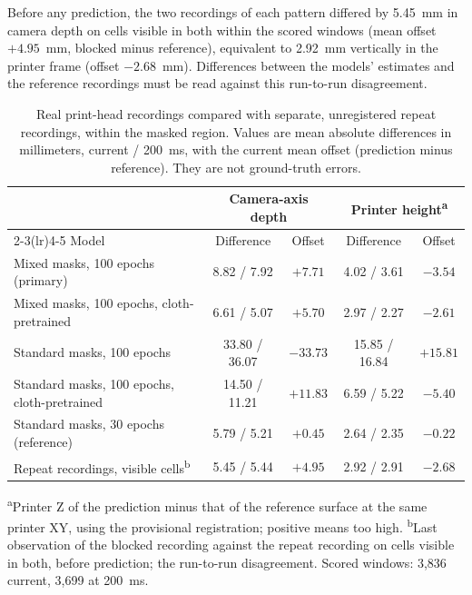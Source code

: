 Before any prediction, the two recordings of each pattern differed by 5.45~mm in camera depth on cells visible in both within the scored windows (mean offset $+4.95$~mm, blocked minus reference), equivalent to 2.92~mm vertically in the printer frame (offset $-2.68$~mm). Differences between the models' estimates and the reference recordings must be read against this run-to-run disagreement.

\begin{table}[t]
\centering
\caption{Real print-head recordings compared with separate, unregistered repeat recordings, within the masked region. Values are mean absolute differences in millimeters, current / 200~ms, with the current mean offset (prediction minus reference). They are not ground-truth errors.}
\label{tab:realhead}
\vspace{4pt}
\small
\begin{tabular}{lcccc}
\toprule
 & \multicolumn{2}{c}{Camera-axis depth} & \multicolumn{2}{c}{Printer height\textsuperscript{a}} \\
\cmidrule(lr){2-3}\cmidrule(lr){4-5}
Model & Difference & Offset & Difference & Offset \\
\midrule
Mixed masks, 100 epochs (primary)            & \phantom{0}8.82 / \phantom{0}7.92 & \phantom{0}$+7.71$ & \phantom{0}4.02 / \phantom{0}3.61 & \phantom{0}$-3.54$ \\
Mixed masks, 100 epochs, cloth-pretrained    & \phantom{0}6.61 / \phantom{0}5.07 & \phantom{0}$+5.70$ & \phantom{0}2.97 / \phantom{0}2.27 & \phantom{0}$-2.61$ \\
Standard masks, 100 epochs                   & 33.80 / 36.07 & $-33.73$ & 15.85 / 16.84 & $+15.81$ \\
Standard masks, 100 epochs, cloth-pretrained & 14.50 / 11.21 & $+11.83$ & \phantom{0}6.59 / \phantom{0}5.22 & \phantom{0}$-5.40$ \\
Standard masks, 30 epochs (reference)        & \phantom{0}5.79 / \phantom{0}5.21 & \phantom{0}$+0.45$ & \phantom{0}2.64 / \phantom{0}2.35 & \phantom{0}$-0.22$ \\
\midrule
Repeat recordings, visible cells\textsuperscript{b} & \phantom{0}5.45 / \phantom{0}5.44 & \phantom{0}$+4.95$ & \phantom{0}2.92 / \phantom{0}2.91 & \phantom{0}$-2.68$ \\
\bottomrule
\end{tabular}

\smallskip
\parbox{\linewidth}{\footnotesize
\textsuperscript{a}Printer Z of the prediction minus that of the reference surface at the same printer XY, using the provisional registration; positive means too high.
\textsuperscript{b}Last observation of the blocked recording against the repeat recording on cells visible in both, before prediction; the run-to-run disagreement. Scored windows: 3,836 current, 3,699 at 200~ms.}
\end{table}

